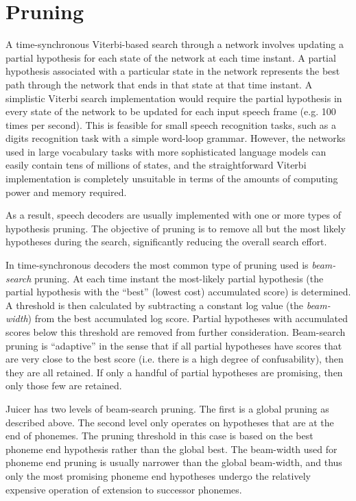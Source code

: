 \documentclass[a4paper,12pt]{report}
\begin{document}
\appendix

\chapter{Pruning}
\label{app:pruning}

A time-synchronous Viterbi-based search through a network involves updating a partial hypothesis for each state of the network at each time instant. A partial hypothesis associated with a particular state in the network represents the best path through the network that ends in that state at that time instant. A simplistic Viterbi search implementation would require the partial hypothesis in every state of the network to be updated for each input speech frame (e.g. 100 times per second). This is feasible for small speech recognition tasks, such as a digits recognition task with a simple word-loop grammar. However, the networks used in large vocabulary tasks with more sophisticated language models can easily contain tens of millions of states, and the straightforward Viterbi implementation is completely unsuitable in terms of the amounts of computing power and memory required.

As a result, speech decoders are usually implemented with one or more types of hypothesis pruning. The objective of pruning is to remove all but the most likely hypotheses during the search, significantly reducing the overall search effort.

In time-synchronous decoders the most common type of pruning used is \emph{beam-search} pruning. At each time instant the most-likely partial hypothesis (the partial hypothesis with the ``best'' (lowest cost) accumulated score) is determined. A threshold is then calculated by subtracting a constant log value (the \emph{beam-width}) from the best accumulated log score. Partial hypotheses with accumulated scores below this threshold are removed from further consideration. Beam-search pruning is ``adaptive'' in the sense that if all partial hypotheses have scores that are very close to the best score (i.e. there is a high degree of confusability), then they are all retained. If only a handful of partial hypotheses are promising, then only those few are retained.

Juicer has two levels of beam-search pruning. The first is a global pruning as described above. The second level only operates on hypotheses that are at the end of phonemes. The pruning threshold in this case is based on the best phoneme end hypothesis rather than the global best. The beam-width used for phoneme end pruning is usually narrower than the global beam-width, and thus only the most promising phoneme end hypotheses undergo the relatively expensive operation of extension to successor phonemes.
\end{document}
